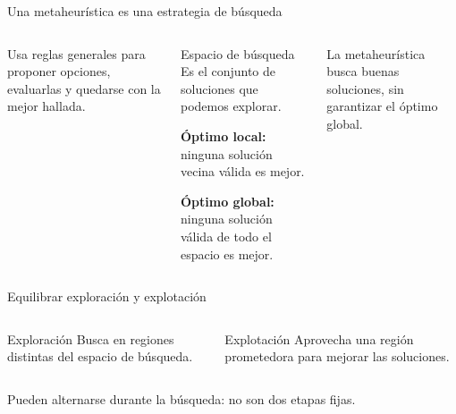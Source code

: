 \documentclass[aspectratio=169,11pt]{beamer}
\newcommand{\key}[1]{\textcolor{primary}{\textbf{#1}}}
\begin{document}
\begin{frame}{Una metaheurística es una estrategia de búsqueda}
  \begin{columns}[c,onlytextwidth]
      \small
      Usa reglas generales para proponer opciones, evaluarlas y quedarse con la mejor hallada.

      \vspace{0.3cm}
      \begin{block}{Espacio de búsqueda}
        Es el conjunto de soluciones que podemos explorar.

        \medskip
        \key{Óptimo local:} ninguna solución vecina válida es mejor.

        \medskip
        \key{Óptimo global:} ninguna solución válida de todo el espacio es mejor.
      \end{block}
      {\footnotesize La metaheurística busca buenas soluciones, sin garantizar el óptimo global.}
      \centering
  \end{columns}
\end{frame}

\begin{frame}{Equilibrar exploración y explotación}
  \begin{columns}[c,onlytextwidth]
      \begin{block}{Exploración}
        Busca en regiones distintas del espacio de búsqueda.
      \end{block}
      \centering
      \vspace{0.25cm}
      \begin{exampleblock}{Explotación}
        Aprovecha una región prometedora para mejorar las soluciones.
      \end{exampleblock}
      \centering
      \vspace{0.25cm}
  \end{columns}
  \vfill
  \centering
  \small Pueden alternarse durante la búsqueda: no son dos etapas fijas.
\end{frame}
\end{document}
